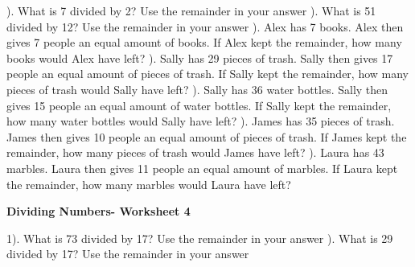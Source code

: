 \documentclass{article}%
\begin{document}
). What is 7 divided by 2? Use the remainder in your answer%
\newline%
\newline%
). What is 51 divided by 12? Use the remainder in your answer%
\newline%
\newline%
). Alex has 7 books. Alex then gives 7 people an equal amount of books. If Alex kept the remainder, how many books would Alex have left?%
\newline%
\newline%
). Sally has 29 pieces of trash. Sally then gives 17 people an equal amount of pieces of trash. If Sally kept the remainder, how many pieces of trash would Sally have left?%
\newline%
\newline%
). Sally has 36 water bottles. Sally then gives 15 people an equal amount of water bottles. If Sally kept the remainder, how many water bottles would Sally have left?%
\newline%
\newline%
). James has 35 pieces of trash. James then gives 10 people an equal amount of pieces of trash. If James kept the remainder, how many pieces of trash would James have left?%
\newline%
\newline%
). Laura has 43 marbles. Laura then gives 11 people an equal amount of marbles. If Laura kept the remainder, how many marbles would Laura have left?%
\newline%
\newline%
\newline%
\pagebreak%
\large%
\begin{center}%
\textbf{Dividing Numbers- Worksheet 4}%
\newline%
\end{center} \normalsize%
1). What is 73 divided by 17? Use the remainder in your answer%
\newline%
\newline%
). What is 29 divided by 17? Use the remainder in your answer%
\newline%
\end{document}

